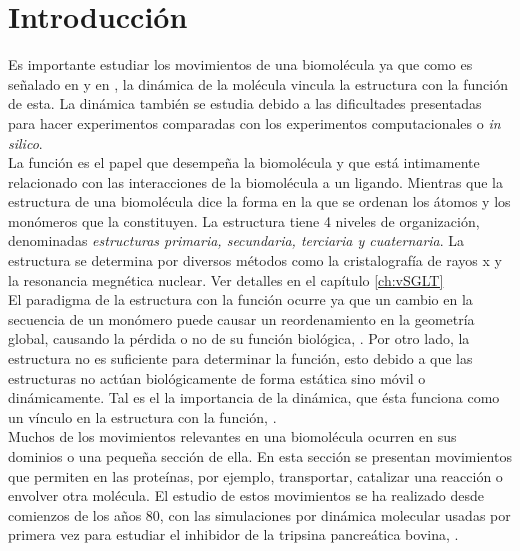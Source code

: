 \chapter*{Introducci\'{o}n}
Es importante estudiar los movimientos de una biomol\'{e}cula ya que como es se\~{n}alado en \cite{Lezon2009} y en  \cite{Rader2006}, la din\'{a}mica de la mol\'{e}cula vincula la estructura con la funci\'{o}n de esta. La din\'{a}mica tambi\'{e}n se estudia debido a las dificultades presentadas para hacer experimentos comparadas con los experimentos computacionales o \textit{in silico}.\\

La funci\'{o}n es el papel que desempe\~{n}a la biomol\'{e}cula y que est\'{a} intimamente relacionado con las interacciones de la biomol\'{e}cula a un ligando. Mientras que la estructura de una biomol\'{e}cula dice la forma en la que se ordenan los \'{a}tomos y los mon\'{o}meros que la constituyen. La estructura tiene 4 niveles de organizaci\'{o}n, denominadas \textit{estructuras primaria, secundaria, terciaria y cuaternaria}. La estructura se determina por diversos m\'{e}todos como la cristalograf\'{i}a de rayos x y la resonancia megn\'{e}tica nuclear. Ver detalles en el cap\'{i}tulo \ref{ch:vSGLT} \\

El paradigma de la estructura con la funci\'{o}n ocurre ya que un cambio en la secuencia de un mon\'{o}mero puede causar un reordenamiento en la geometr\'{i}a global, causando la p\'{e}rdida o no de su funci\'{o}n biol\'{o}gica, \cite{Dykeman2010NormalPhysics}. Por otro lado, la estructura no es suficiente para determinar la funci\'{o}n, esto debido a que las estructuras no act\'{u}an biol\'{o}gicamente de forma est\'{a}tica sino m\'{o}vil o din\'{a}micamente. Tal es el la importancia de la din\'{a}mica, que \'{e}sta funciona como un v\'{i}nculo en la estructura con la funci\'{o}n, \cite{Bahar2005Coarse-grainedBiology}.\\


Muchos de los movimientos relevantes en una biomol\'{e}cula ocurren en sus dominios o una peque\~{n}a secci\'{o}n de ella. En esta secci\'{o}n se presentan movimientos que 
permiten en las prote\'{i}nas, por ejemplo, transportar, catalizar una reacci\'{o}n o envolver otra mol\'{e}cula. El estudio de estos movimientos se ha realizado desde comienzos de los a\~{n}os 80, con las simulaciones por din\'{a}mica molecular usadas por primera vez para estudiar el inhibidor de la tripsina pancre\'{a}tica bovina,  \cite{Bahar2005Coarse-grainedBiology}.\\

